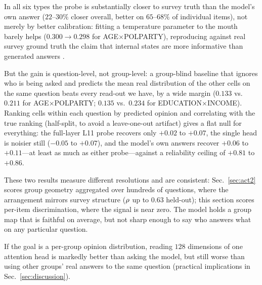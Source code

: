 In all six types the probe is substantially closer to survey truth than
the model's own answer ($22$--$30\%$ closer overall, better on
$65$--$68\%$ of individual items), not merely by better calibration:
fitting a temperature parameter to the mouth barely helps
($0.300\to0.298$ for AGE$\times$POLPARTY), reproducing against real
survey ground truth the claim that internal states are more informative
than generated answers \citep{llmopinions2026}.

But the gain is question-level, not group-level: a group-blind baseline
that ignores who is being asked and predicts the mean real distribution
of the other cells on the same question beats every read-out we have, by
a wide margin ($0.133$ vs.\ $0.211$ for AGE$\times$POLPARTY; $0.135$
vs.\ $0.234$ for EDUCATION$\times$INCOME). Ranking cells within each
question by predicted opinion and correlating with the true ranking
(half-split, to avoid a leave-one-out artifact) gives a flat null for
everything: the full-layer L11 probe recovers only $+0.02$ to $+0.07$,
the single head \starhead{} is noisier still ($-0.05$ to $+0.07$), and
the model's own answers recover $+0.06$ to $+0.11$---at least as much as
either probe---against a reliability ceiling of $+0.81$ to $+0.86$.

These two results measure different resolutions and are consistent:
Sec.~\ref{sec:act2} scores group geometry aggregated over hundreds of
questions, where the arrangement mirrors survey structure ($\rho$ up to
$0.63$ held-out); this section scores per-item discrimination, where the
signal is near zero. The model holds a group map that is faithful on
average, but not sharp enough to say who answers what on any particular
question.

If the goal is a per-group opinion distribution, reading $128$
dimensions of one attention head is markedly better than asking the
model, but still worse than using other groups' real answers to the
same question (practical implications in Sec.~\ref{sec:discussion}).
